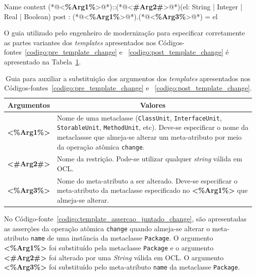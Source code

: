 \begin{codigo}[caption={[\textit{Template} OCL para realizar a pós-condição da operação atômica \texttt{change}.] \textit{Template} OCL para realizar a pré-condição da operação atômica \texttt{change}.},escapeinside={(*@}{@*)}, basicstyle=\footnotesize, label={codigo:post_template_change}, language=OCL]{Name}
context (*@<\textbf{\%Arg1\%}>@*)::(*@<\textbf{\#Arg2\#}>@*)(el: String | Integer | Real | Boolean)
post : (*@<\textbf{\%Arg1\%}>@*).(*@<\textbf{\%Arg3\%}>@*) = el
\end{codigo}

O guia utilizado pelo engenheiro de modernização para especificar corretamente as partes variantes dos \textit{templates} apresentados nos Códigos-fontes~\ref{codigo:pre_template_change} e ~\ref{codigo:post_template_change} é apresentado na Tabela~\ref{tab:guia_template_pre_pos_change}.

\begin{table}[h]
\centering
\caption{Guia para auxiliar a substituição dos argumentos dos \textit{templates} apresentados nos Códigos-fontes~\ref{codigo:pre_template_change} e ~\ref{codigo:post_template_change}.}
\label{tab:guia_template_pre_pos_change}
\begin{tabular}{ | m{1.7cm} | m{12cm}| } 
\hline
\multicolumn{1}{|c|}{Argumentos}                                         & \multicolumn{1}{c|}{Valores} \\ \hline
\multicolumn{1}{|c|}{\textbf{<\%Arg1\%>}} & Nome de uma metaclasse (\texttt{ClassUnit}, \texttt{InterfaceUnit}, \texttt{StorableUnit}, \texttt{MethodUnit}, etc). Deve-se especificar o nome da metaclassse que almeja-se alterar um meta-atributo por meio da operação atômica \texttt{change}. \\ 
\hline
\multicolumn{1}{|c|}{\textbf{<\#Arg2\#>}} & Nome da restrição. Pode-se utilizar qualquer \textit{string} válida em OCL. \\ 
\hline
\multicolumn{1}{|c|}{\textbf{<\%Arg3\%>}} & Nome do meta-atributo a ser alterado. Deve-se especificar o meta-atributo da metaclasse especificado no \textbf{<\%Arg1\%>} que almeja-se alterar. \\ 
\hline
\end{tabular}
\end{table}

No Código-fonte~\ref{codigo:template_assercao_juntado_change}, são apresentadas as asserções da operação atômica \texttt{change} quando almeja-se alterar o meta-atributo \texttt{name} de uma instância da metaclasse \texttt{Package}. O argumento \textbf{<\%Arg1\%>} foi substituído pela metaclasse \texttt{Package} e o argumento \textbf{<\#Arg2\#>} foi alterado por uma \textit{String} válida em OCL. O argumento \textbf{<\%Arg3\%>} foi substituído pelo meta-atributo \texttt{name} da metaclasse \texttt{Package}.

